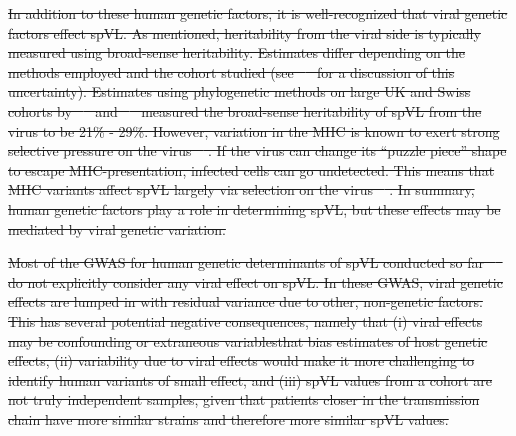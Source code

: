 \documentclass[11pt]{article} %
\providecommand{\DIFdel}[1]{{\protect\color{red}\sout{#1}}}                      %
\begin{document}
\begin{linenumbers}
\DIFdel{In addition to these human genetic factors, it is well-recognized that viral genetic factors effect spVL. As mentioned, heritability from the viral side is typically measured using broad-sense heritability. Estimates differ depending on the methods employed and the cohort studied (see \mbox{%
\citet{Mitov2018} }\hskip0pt%
for a discussion of this uncertainty). Estimates using phylogenetic methods on large UK and Swiss cohorts by \mbox{%
\citep{Mitov2018} }\hskip0pt%
and \mbox{%
\citep{Bertels2018} }\hskip0pt%
measured the broad-sense heritability of spVL from the virus to be 21\% - 29\%. However, variation in the MHC is known to exert strong selective pressure on the virus \mbox{%
\citep{Kloverpris2016, Nguyen2021SystematicLink}}\hskip0pt%
. If the virus can change its ``puzzle piece'' shape to escape MHC-presentation, infected cells can go undetected. This means that MHC variants affect spVL largely via selection on the virus \mbox{%
\citep{Bartha2017}}\hskip0pt%
. In summary, human genetic factors play a role in determining spVL, but these effects may be mediated by viral genetic variation.
}%

\DIFdel{Most of the GWAS for human genetic determinants of spVL conducted so far \mbox{%
\citep{Dalmasso2008, Fellay2007, Pereyra2010, Fellay2009, Pelak2010, VanManen2011, McLaren2012, McLaren2015} }\hskip0pt%
do not explicitly consider any viral effect on spVL. In these GWAS, viral genetic effects are lumped in with residual variance due to other, non-genetic factors. This has several potential negative consequences, namely that (i) viral effects may be confounding or extraneous variablesthat bias estimates of host genetic effects, (ii) variability due to viral effects would make it more challenging to identify human variants of small effect, and (iii) spVL values from a cohort are not truly independent samples, given that patients closer in the transmission chain have more similar strains and therefore more similar spVL values. }%


\end{linenumbers}
\end{document}
